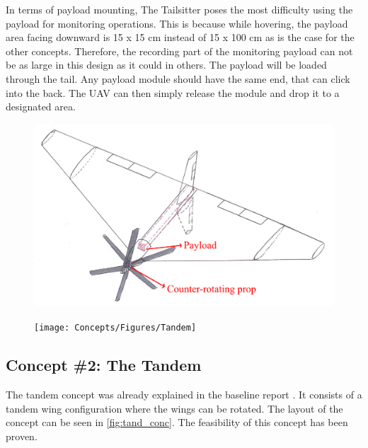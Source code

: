 In terms of payload mounting, The Tailsitter poses the most difficulty using the payload for monitoring operations. This is because while hovering, the payload area facing downward is 15 x 15 cm instead of 15 x 100 cm as is the case for the other concepts. Therefore, the recording part of the monitoring payload can not be as large in this design as it could in others. The payload will be loaded through the tail. Any payload module should have the same end, that can click into the back. The UAV can then simply release the module and drop it to a designated area.



\begin{figure}[htb]
\centering
\begin{minipage}{.5\textwidth}
  \centering
  \includegraphics[width=.95\linewidth]{Concepts/Figures/Tailsitter}
  \label{fig:tail_conc}
\end{minipage}%
\begin{minipage}{.5\textwidth}
  \centering
  \texttt{[image: Concepts/Figures/Tandem]}
  \label{fig:tand_conc}
\end{minipage}
\end{figure}


\subsection{Concept \#2: The Tandem}
The tandem concept was already explained in the baseline report \cite{baseline}. It consists of a tandem wing configuration where the wings can be rotated. The layout of the concept can be seen in \autoref{fig:tand_conc}. The feasibility of this concept has been proven\footnotemark.

